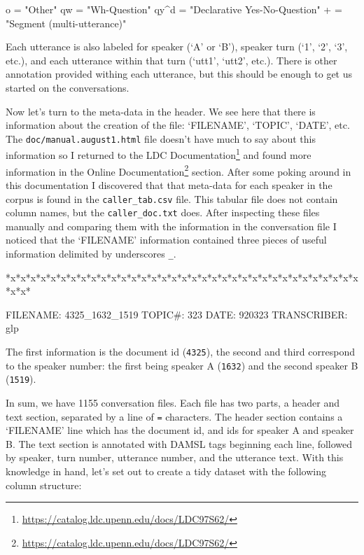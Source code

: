 \documentclass[
  letterpaper,
]{scrbook}
\newenvironment{Shaded}{\begin{snugshade}}{\end{snugshade}}
\newcommand{\NormalTok}[1]{\textcolor[rgb]{0.00,0.00,0.00}{#1}}
\DeclareRobustCommand{\href}[2]{#2\footnote{\url{#1}}}
\begin{document}
\begin{Shaded}
\begin{Highlighting}[]
\NormalTok{o = "Other"}
\NormalTok{qw = "Wh{-}Question"}
\NormalTok{qy\^{}d = "Declarative Yes{-}No{-}Question"}
\NormalTok{+ = "Segment (multi{-}utterance)"}
\end{Highlighting}
\end{Shaded}

Each utterance is also labeled for speaker (`A' or `B'), speaker turn
(`1', `2', `3', etc.), and each utterance within that turn (`utt1',
`utt2', etc.). There is other annotation provided withing each
utterance, but this should be enough to get us started on the
conversations.

Now let's turn to the meta-data in the header. We see here that there is
information about the creation of the file: `FILENAME', `TOPIC', `DATE',
etc. The \texttt{doc/manual.august1.html} file doesn't have much to say
about this information so I returned to the
\href{https://catalog.ldc.upenn.edu/docs/LDC97S62/}{LDC Documentation}
and found more information in the
\href{https://catalog.ldc.upenn.edu/docs/LDC97S62/}{Online
Documentation} section. After some poking around in this documentation I
discovered that that meta-data for each speaker in the corpus is found
in the \texttt{caller\_tab.csv} file. This tabular file does not contain
column names, but the \texttt{caller\_doc.txt} does. After inspecting
these files manually and comparing them with the information in the
conversation file I noticed that the `FILENAME' information contained
three pieces of useful information delimited by underscores \texttt{\_}.

\begin{Shaded}
\begin{Highlighting}[]
\NormalTok{*x*x*x*x*x*x*x*x*x*x*x*x*x*x*x*x*x*x*x*x*x*x*x*x*x*x*x*x*x*x*x*x*x*x*x*x*x*}


\NormalTok{FILENAME:   4325\_1632\_1519}
\NormalTok{TOPIC\#:     323}
\NormalTok{DATE:       920323}
\NormalTok{TRANSCRIBER:    glp}
\end{Highlighting}
\end{Shaded}

The first information is the document id (\texttt{4325}), the second and
third correspond to the speaker number: the first being speaker A
(\texttt{1632}) and the second speaker B (\texttt{1519}).

In sum, we have 1155 conversation files. Each file has two parts, a
header and text section, separated by a line of \texttt{=} characters.
The header section contains a `FILENAME' line which has the document id,
and ids for speaker A and speaker B. The text section is annotated with
DAMSL tags beginning each line, followed by speaker, turn number,
utterance number, and the utterance text. With this knowledge in hand,
let's set out to create a tidy dataset with the following column
structure:
\end{document}
